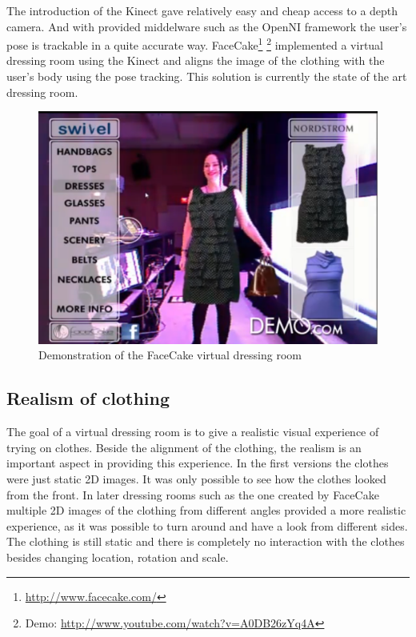 \documentclass[a4paper]{article}
\begin{document}
The introduction of the Kinect gave relatively easy and cheap access to a depth camera. And with provided middelware such as the OpenNI framework the user's pose is trackable in a quite accurate way. FaceCake\footnote{\url{http://www.facecake.com/}} \footnote{Demo: \url{http://www.youtube.com/watch?v=A0DB26zYq4A}} implemented a virtual dressing room using the Kinect and aligns the image of the clothing with the user's body using the pose tracking. This solution is currently the state of the art dressing room.

\begin{figure}[htp]
\centering
\includegraphics[scale=0.1]{facecake.png} 
\caption{Demonstration of the FaceCake virtual dressing room}
\label{fig:facecake}
\end{figure}

\subsection{Realism of clothing}

The goal of a virtual dressing room is to give a realistic visual experience of trying on clothes. Beside the alignment of the clothing, the realism is an important aspect in providing this experience. In the first versions the clothes were just static 2D images. It was only possible to see how the clothes looked from the front. In later dressing rooms such as the one created by FaceCake multiple 2D images of the clothing from different angles provided a more realistic experience, as it was possible to turn around and have a look from different sides. The clothing is still static and there is completely no interaction with the clothes besides changing location, rotation and scale.
\end{document}
